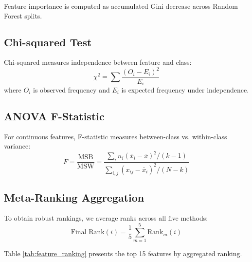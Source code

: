 \documentclass[journal]{IEEEtran}
\begin{document}
Feature importance is computed as accumulated Gini decrease across Random Forest splits.

\subsection{Chi-squared Test}

Chi-squared measures independence between feature and class:
\begin{equation}
\chi^2 = \sum \frac{(O_i - E_i)^2}{E_i}
\end{equation}
where $O_i$ is observed frequency and $E_i$ is expected frequency under independence.

\subsection{ANOVA F-Statistic}

For continuous features, F-statistic measures between-class vs. within-class variance:
\begin{equation}
F = \frac{\text{MSB}}{\text{MSW}} = \frac{\sum_{i} n_i (\bar{x}_i - \bar{x})^2 / (k-1)}{\sum_{i,j} (x_{ij} - \bar{x}_i)^2 / (N-k)}
\end{equation}

\subsection{Meta-Ranking Aggregation}

To obtain robust rankings, we average ranks across all five methods:
\begin{equation}
\text{Final Rank}(i) = \frac{1}{5} \sum_{m=1}^{5} \text{Rank}_m(i)
\end{equation}

Table \ref{tab:feature_ranking} presents the top 15 features by aggregated ranking.
\end{document}
